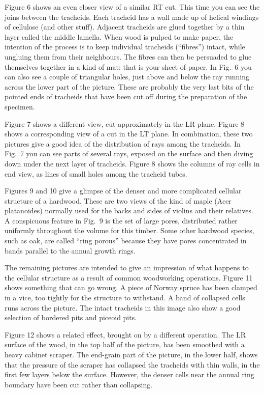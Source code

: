   Figure 6 shows an even closer view of a similar RT cut. This time you can see 
  the joins between the tracheids. Each tracheid has a wall made up of helical 
  windings of cellulose (and other stuff). Adjacent tracheids are glued 
  together by a thin layer called the middle lamella. When wood is pulped to 
  make paper, the intention of the process is to keep individual tracheids 
  (“fibres”) intact, while ungluing them from their neighbours. The fibres can 
  then be persuaded to glue themselves together in a kind of mat: that is your 
  sheet of paper. In Fig.\ 6 you can also see a couple of triangular holes, 
  just above and below the ray running across the lower part of the picture. 
  These are probably the very last bits of the pointed ends of tracheids that 
  have been cut off during the preparation of the specimen. 

  Figure 7 shows a different view, cut approximately in the LR plane. Figure 8 
  shows a corresponding view of a cut in the LT plane. In combination, these 
  two pictures give a good idea of the distribution of rays among the 
  tracheids. In Fig.\ 7 you can see parts of several rays, exposed on the 
  surface and then diving down under the next layer of tracheids. Figure 8 
  shows the columns of ray cells in end view, as lines of small holes among the 
  tracheid tubes. 

  Figures 9 and 10 give a glimpse of the denser and more complicated cellular 
  structure of a hardwood. These are two views of the kind of maple (Acer 
  platanoides) normally used for the backs and sides of violins and their 
  relatives. A conspicuous feature in Fig.\ 9 is the set of large pores, 
  distributed rather uniformly throughout the volume for this timber. Some 
  other hardwood species, such as oak, are called “ring porous” because they 
  have pores concentrated in bands parallel to the annual growth rings. 

  The remaining pictures are intended to give an impression of what happens to 
  the cellular structure as a result of common woodworking operations. Figure 
  11 shows something that can go wrong. A piece of Norway spruce has been 
  clamped in a vice, too tightly for the structure to withstand. A band of 
  collapsed cells runs across the picture. The intact tracheids in this image 
  also show a good selection of bordered pits and piceoid pits. 

  Figure 12 shows a related effect, brought on by a different operation. The LR 
  surface of the wood, in the top half of the picture, has been smoothed with a 
  heavy cabinet scraper. The end-grain part of the picture, in the lower half, 
  shows that the pressure of the scraper has collapsed the tracheids with thin 
  walls, in the first few layers below the surface. However, the denser cells 
  near the annual ring boundary have been cut rather than collapsing. 

